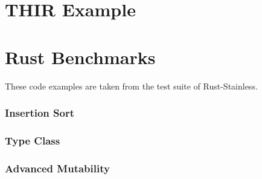 \section{THIR Example}


\clearpage
\section{Rust Benchmarks}

These code examples are taken from the test suite of Rust-Stainless.

\subsubsection{Insertion Sort}


\subsubsection{Type Class}


\subsubsection{Advanced Mutability}

